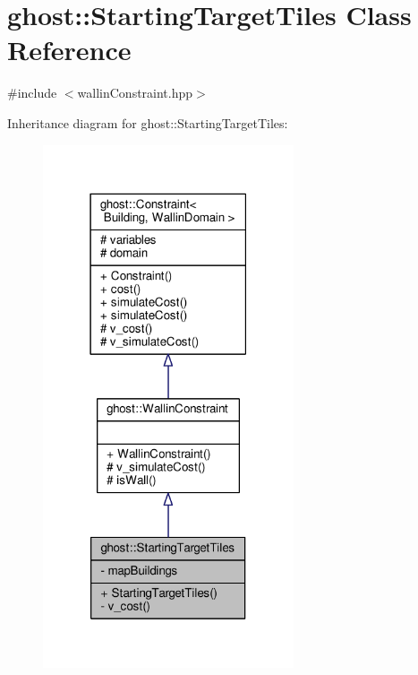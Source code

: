 \hypertarget{classghost_1_1StartingTargetTiles}{\section{ghost\-:\-:Starting\-Target\-Tiles Class Reference}
\label{classghost_1_1StartingTargetTiles}
}


{\ttfamily \#include $<$wallin\-Constraint.\-hpp$>$}



Inheritance diagram for ghost\-:\-:Starting\-Target\-Tiles\-:
\nopagebreak
\begin{figure}[H]
\begin{center}
\leavevmode
\includegraphics[width=210pt]{classghost_1_1StartingTargetTiles__inherit__graph}
\end{center}
\end{figure}


